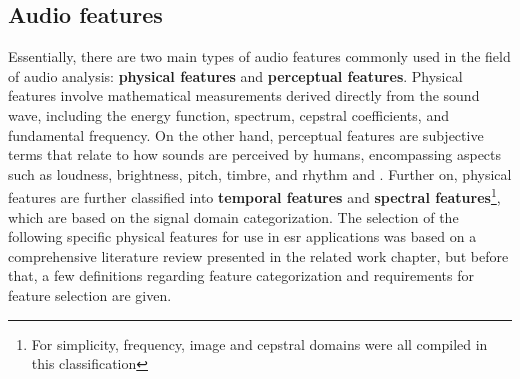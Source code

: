 \subsection{Audio features}
\label{subsec:audio_fundamentals_audio_features}

Essentially, there are two main types of audio features commonly used in the field of audio analysis: \textbf{physical features} and \textbf{perceptual features}. Physical features involve mathematical measurements derived directly from the sound wave, including the energy function, spectrum, cepstral coefficients, and fundamental frequency. On the other hand, perceptual features are subjective terms that relate to how sounds are perceived by humans, encompassing aspects such as loudness, brightness, pitch, timbre, and rhythm \cite{Zhang2010} and \cite{Alias2016}. Further on, physical features are further classified into \textbf{temporal features} and \textbf{spectral features}\footnote{For simplicity, frequency, image and cepstral domains were all compiled in this classification}, which are based on the signal domain categorization. The selection of the following specific physical features for use in \gls{esr} applications was based on a comprehensive literature review presented in the related work chapter, but before that, a few definitions regarding feature categorization and requirements for feature selection are given.




